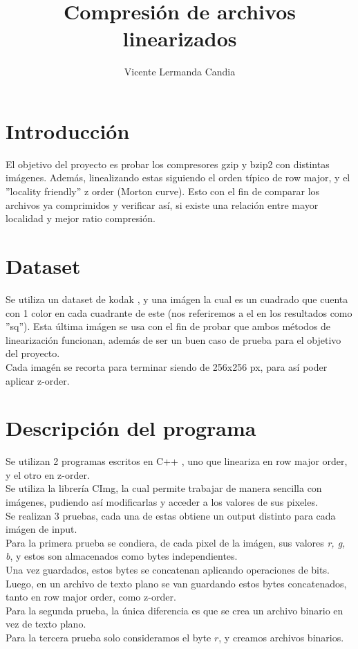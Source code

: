 \documentclass[12pt]{article}
\begin{document}
\title{Compresión de archivos linearizados}
\author{Vicente Lermanda Candia}
\date{}

\maketitle

\section*{Introducción}
El objetivo del proyecto es probar los compresores gzip y bzip2 con
distintas imágenes. Además, linealizando estas siguiendo el orden típico de
row major, y el ''locality friendly'' z order (Morton curve). Esto con el
fin de comparar los archivos ya comprimidos y verificar así, si existe una
relación entre mayor localidad y mejor ratio compresión.

\section*{Dataset}
Se utiliza un dataset de kodak \cite{kodak}, y una imágen la cual es un cuadrado que cuenta
con 1 color en cada cuadrante de este \cite{square}(nos referiremos a el en los resultados como ''sq''). Esta última imágen se usa con el fin
de probar que ambos métodos de linearización funcionan, además de ser un
buen caso de prueba para el objetivo del proyecto.\\
Cada imagén se recorta para terminar siendo de 256x256 px, para así poder
aplicar z-order.

\section*{Descripción del programa}
Se utilizan 2 programas escritos en C++ \cite{codes}, uno que lineariza en row major order,
y el otro en z-order.\\
Se utiliza la librería CImg, la cual permite trabajar de manera sencilla con
imágenes, pudiendo así modificarlas y acceder a los valores de sus pixeles.\\
Se realizan 3 pruebas, cada una de estas obtiene un output distinto para cada
imágen de input.\\
Para la primera prueba se condiera, de cada pixel de la imágen, sus valores
\emph{r, g, b}, y estos son almacenados como bytes independientes.\\
Una vez guardados, estos bytes se concatenan aplicando operaciones de bits.\\
Luego, en un archivo de texto plano se van guardando estos bytes concatenados,
tanto en row major order, como z-order.\\
Para la segunda prueba, la única diferencia es que se crea un archivo binario
en vez de texto plano.\\
Para la tercera prueba solo consideramos el byte $r$, y creamos archivos binarios.
\end{document}
